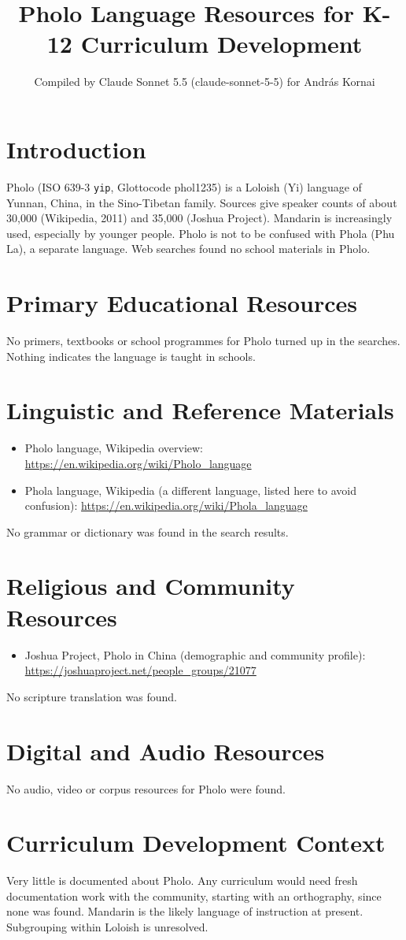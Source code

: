 \documentclass[12pt]{article}
\title{Pholo Language Resources for K-12 Curriculum Development}
\author{Compiled by Claude Sonnet 5.5 (claude-sonnet-5-5) for Andr\'as Kornai}
\date{}
\begin{document}
\maketitle

\section{Introduction}
Pholo (ISO 639-3 \texttt{yip}, Glottocode phol1235) is a Loloish (Yi) language of Yunnan, China, in the Sino-Tibetan family. Sources give speaker counts of about 30,000 (Wikipedia, 2011) and 35,000 (Joshua Project). Mandarin is increasingly used, especially by younger people. Pholo is not to be confused with Phola (Phu La), a separate language. Web searches found no school materials in Pholo.

\section{Primary Educational Resources}
No primers, textbooks or school programmes for Pholo turned up in the searches. Nothing indicates the language is taught in schools.

\section{Linguistic and Reference Materials}
\begin{itemize}
\item Pholo language, Wikipedia overview: \url{https://en.wikipedia.org/wiki/Pholo_language}
\item Phola language, Wikipedia (a different language, listed here to avoid confusion): \url{https://en.wikipedia.org/wiki/Phola_language}
\end{itemize}
No grammar or dictionary was found in the search results.

\section{Religious and Community Resources}
\begin{itemize}
\item Joshua Project, Pholo in China (demographic and community profile): \url{https://joshuaproject.net/people_groups/21077}
\end{itemize}
No scripture translation was found.

\section{Digital and Audio Resources}
No audio, video or corpus resources for Pholo were found.

\section{Curriculum Development Context}
Very little is documented about Pholo. Any curriculum would need fresh documentation work with the community, starting with an orthography, since none was found. Mandarin is the likely language of instruction at present. Subgrouping within Loloish is unresolved.
\end{document}
